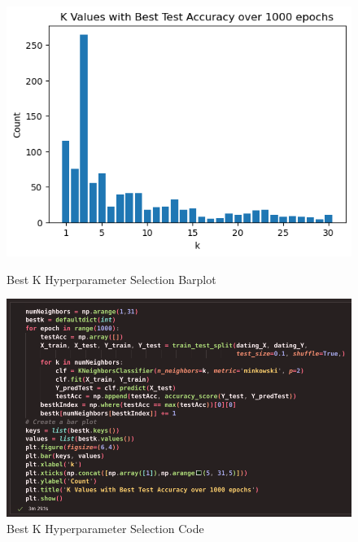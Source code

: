 \documentclass{article}
\begin{document}
    \begin{figure}[H]
        \centering
        \begin{minipage}[t]{0.45\textwidth}
            \centering
            \includegraphics[width=\textwidth, height=0.2\textheight]{k-NN_selection.png}
            \caption{\small{Best K Hyperparameter Selection Barplot}}
        \end{minipage}
        \hfill
        \begin{minipage}[t]{0.54\textwidth}
            \centering
            \includegraphics[width=\textwidth, height=0.25\textheight]{k-NN_selection_code.png}
            \caption{\small{Best K Hyperparameter Selection Code}}
        \end{minipage}
    \end{figure}

    \newpage
\end{document}
